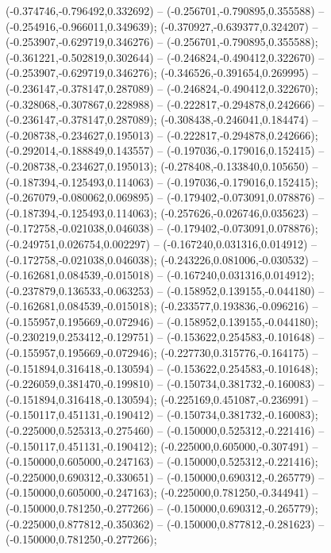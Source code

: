  (-0.374746,-0.796492,0.332692) -- (-0.256701,-0.790895,0.355588) -- (-0.254916,-0.966011,0.349639);
 (-0.370927,-0.639377,0.324207) -- (-0.253907,-0.629719,0.346276) -- (-0.256701,-0.790895,0.355588);
 (-0.361221,-0.502819,0.302644) -- (-0.246824,-0.490412,0.322670) -- (-0.253907,-0.629719,0.346276);
 (-0.346526,-0.391654,0.269995) -- (-0.236147,-0.378147,0.287089) -- (-0.246824,-0.490412,0.322670);
 (-0.328068,-0.307867,0.228988) -- (-0.222817,-0.294878,0.242666) -- (-0.236147,-0.378147,0.287089);
 (-0.308438,-0.246041,0.184474) -- (-0.208738,-0.234627,0.195013) -- (-0.222817,-0.294878,0.242666);
 (-0.292014,-0.188849,0.143557) -- (-0.197036,-0.179016,0.152415) -- (-0.208738,-0.234627,0.195013);
 (-0.278408,-0.133840,0.105650) -- (-0.187394,-0.125493,0.114063) -- (-0.197036,-0.179016,0.152415);
 (-0.267079,-0.080062,0.069895) -- (-0.179402,-0.073091,0.078876) -- (-0.187394,-0.125493,0.114063);
 (-0.257626,-0.026746,0.035623) -- (-0.172758,-0.021038,0.046038) -- (-0.179402,-0.073091,0.078876);
 (-0.249751,0.026754,0.002297) -- (-0.167240,0.031316,0.014912) -- (-0.172758,-0.021038,0.046038);
 (-0.243226,0.081006,-0.030532) -- (-0.162681,0.084539,-0.015018) -- (-0.167240,0.031316,0.014912);
 (-0.237879,0.136533,-0.063253) -- (-0.158952,0.139155,-0.044180) -- (-0.162681,0.084539,-0.015018);
 (-0.233577,0.193836,-0.096216) -- (-0.155957,0.195669,-0.072946) -- (-0.158952,0.139155,-0.044180);
 (-0.230219,0.253412,-0.129751) -- (-0.153622,0.254583,-0.101648) -- (-0.155957,0.195669,-0.072946);
 (-0.227730,0.315776,-0.164175) -- (-0.151894,0.316418,-0.130594) -- (-0.153622,0.254583,-0.101648);
 (-0.226059,0.381470,-0.199810) -- (-0.150734,0.381732,-0.160083) -- (-0.151894,0.316418,-0.130594);
 (-0.225169,0.451087,-0.236991) -- (-0.150117,0.451131,-0.190412) -- (-0.150734,0.381732,-0.160083);
 (-0.225000,0.525313,-0.275460) -- (-0.150000,0.525312,-0.221416) -- (-0.150117,0.451131,-0.190412);
 (-0.225000,0.605000,-0.307491) -- (-0.150000,0.605000,-0.247163) -- (-0.150000,0.525312,-0.221416);
 (-0.225000,0.690312,-0.330651) -- (-0.150000,0.690312,-0.265779) -- (-0.150000,0.605000,-0.247163);
 (-0.225000,0.781250,-0.344941) -- (-0.150000,0.781250,-0.277266) -- (-0.150000,0.690312,-0.265779);
 (-0.225000,0.877812,-0.350362) -- (-0.150000,0.877812,-0.281623) -- (-0.150000,0.781250,-0.277266);
